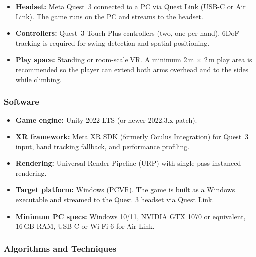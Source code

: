 \documentclass[12pt]{article}
\begin{document}
\begin{itemize}[leftmargin=2em]
    \item \textbf{Headset:} Meta Quest~3 connected to a PC via Quest Link (USB-C or Air Link). The game runs on the PC and streams to the headset.
    \item \textbf{Controllers:} Quest~3 Touch Plus controllers (two, one per hand). 6DoF tracking is required for swing detection and spatial positioning.
    \item \textbf{Play space:} Standing or room-scale VR. A minimum 2\,m $\times$ 2\,m play area is recommended so the player can extend both arms overhead and to the sides while climbing.
\end{itemize}

\subsubsection{Software}

\begin{itemize}[leftmargin=2em]
    \item \textbf{Game engine:} Unity 2022 LTS (or newer 2022.3.x patch).
    \item \textbf{XR framework:} Meta XR SDK (formerly Oculus Integration) for Quest~3 input, hand tracking fallback, and performance profiling.
    \item \textbf{Rendering:} Universal Render Pipeline (URP) with single-pass instanced rendering.
    \item \textbf{Target platform:} Windows (PCVR). The game is built as a Windows executable and streamed to the Quest~3 headset via Quest Link.
    \item \textbf{Minimum PC specs:} Windows 10/11, NVIDIA GTX 1070 or equivalent, 16\,GB RAM, USB-C or Wi-Fi 6 for Air Link.
\end{itemize}

\subsubsection{Algorithms and Techniques}
\end{document}
